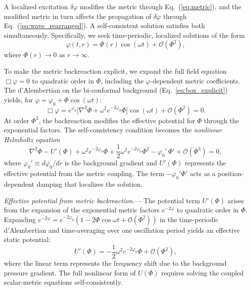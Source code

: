 \documentclass[aps,prd,onecolumn,superscriptaddress,nofootinbib,showpacs,12pt,notitlepage]{revtex4-2}
\renewcommand{\order}[1]{\mathcal{O}\!\left(#1\right)}
\begin{document}
A localized excitation $\delta\varphi$ modifies the metric
through Eq.~(\ref{eq:metric}), and the modified metric
in turn affects the propagation of $\delta\varphi$
through Eq.~(\ref{eq:wave_rearranged}).  A self-consistent
solution satisfies both simultaneously.  Specifically,
we seek time-periodic, localized solutions of the form
\begin{equation}\label{eq:oscillon}
  \varphi(t,r) = \Phi(r)\cos(\omega t) + \order{\Phi^2},
\end{equation}
where $\Phi(r) \to 0$ as $r \to \infty$.

To make the metric backreaction explicit, we expand the
full field equation $\Box\varphi = 0$ to quadratic order
in $\Phi$, including the $\varphi$-dependent metric
coefficients.  The d'Alembertian on the bi-conformal
background (Eq.~\ref{eq:box_explicit}) yields, for
$\varphi = \varphi_0 + \Phi\cos(\omega t)$:
\begin{equation}\label{eq:box_expanded}
  \Box\varphi = e^{\varphi_0}\bigl[\nabla^2\Phi + \omega^2 e^{-2\varphi_0}\Phi\bigr]\cos(\omega t) + \order{\Phi^2} = 0.
\end{equation}
At order $\Phi^2$, the backreaction modifies the effective
potential for $\Phi$ through the exponential factors.  The
self-consistency condition becomes the \emph{nonlinear
Helmholtz equation}
\begin{equation}\label{eq:self_consistent}
  \nabla^{2}\Phi - U'(\Phi) + \omega^{2}e^{-2\varphi_0}\Phi
  + \frac{1}{2}\omega^2 e^{-2\varphi_0}\Phi^{2}
  - \varphi_0'\,\Phi' + \order{\Phi^3} = 0,
\end{equation}
where $\varphi_0' \equiv d\varphi_0/dr$ is the background
gradient and $U'(\Phi)$ represents the effective potential
from the metric coupling.  The term $-\varphi_0'\Phi'$
acts as a position-dependent damping that localizes the
solution.

\textit{Effective potential from metric backreaction.}---
The potential term $U'(\Phi)$ arises from the expansion
of the exponential metric factors $e^{-2\varphi}$ to
quadratic order in $\Phi$.  Expanding $e^{-2\varphi} =
e^{-2\varphi_0}(1 - 2\Phi\cos\omega t + \order{\Phi^2})$
in the time-periodic d'Alembertian and time-averaging over
one oscillation period yields an effective static potential:
\begin{equation}\label{eq:U_effective}
  U'(\Phi) = -\frac{1}{2}\omega^2 e^{-2\varphi_0}\Phi
  + \order{\Phi^2},
\end{equation}
where the linear term represents the frequency shift due
to the background pressure gradient.  The full nonlinear
form of $U(\Phi)$ requires solving the coupled scalar-metric
equations self-consistently.
\end{document}
